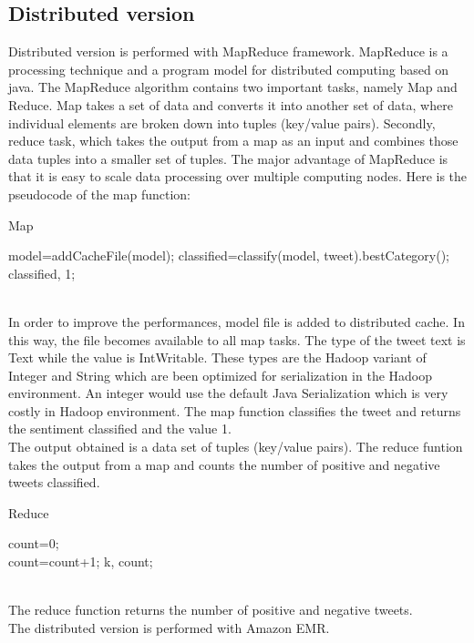 \documentclass[10pt,twocolumn,letterpaper]{article}
\begin{document}
\subsection{Distributed version}
Distributed version is performed with MapReduce framework. MapReduce is a processing technique and a program model for distributed computing based on java. The MapReduce algorithm contains two important tasks, namely Map and Reduce.  Map takes a set of data and converts it into another set of data, where individual elements are broken down into tuples (key/value pairs). Secondly, reduce task, which takes the output from a map as an input and combines those data tuples into a smaller set of tuples. The major advantage of MapReduce is that it is easy to scale data processing over multiple computing nodes. Here is the pseudocode of the map function:\\
\begin{algorithm}
\label{Map}
\caption{Map}
\begin{algorithmic}
\State model=addCacheFile(model);
\State classified=classify(model, tweet).bestCategory();
\State \Return classified, 1;
\end{algorithmic}
\end{algorithm} \\
In order to improve the performances, model file is added to distributed cache. In this way, the file becomes available to all map tasks. The type of the tweet text is Text while the value is IntWritable. These types are the Hadoop variant of Integer and String which are been optimized for serialization in the Hadoop environment. An integer would use the default Java Serialization which is very costly in Hadoop environment. The map function classifies the tweet and returns the sentiment classified and the value 1.\\
The output obtained is a data set of tuples (key/value pairs). The reduce funtion takes the output from a map and counts the number of positive and negative tweets classified.
\begin{algorithm}
\label{Reduce}
\caption{Reduce}
\begin{algorithmic}
\State count=0;
    	 \do \\
		\State count=count+1;
	\EndFor 
\State \Return k, count;
\end{algorithmic}
\end{algorithm} \\
The reduce function returns the number of positive and negative tweets.\\
The distributed version is performed with Amazon EMR.
\end{document}
